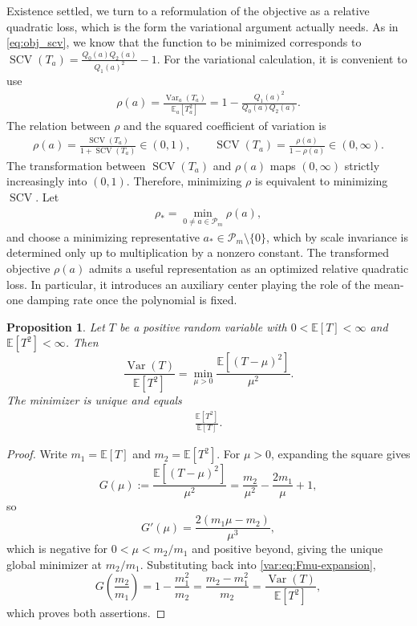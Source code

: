 \documentclass[11pt]{article}
\numberwithin{equation}{section}
\newtheorem{proposition}[theorem]{Proposition}
\theoremstyle{definition}
\theoremstyle{remark}
\newcommand{\E}{\mathbb E}
\newcommand{\Var}{\operatorname{Var}}
\newcommand{\SCV}{\operatorname{SCV}}
\newcommand{\Pcal}{\mathcal P}
\begin{document}
Existence settled, we turn to a reformulation of the objective as a relative quadratic loss, which is the form the variational argument actually needs. 
 As in \eqref{eq:obj_scv}, we know that the function to be minimized corresponds to $\SCV(T_a)=\frac{Q_0(a)Q_2(a)}{Q_1(a)^2}-1$.
For the variational calculation, it is convenient to use
\begin{align*}
    \rho(a)
    =\frac{\Var_a(T_a)}{\E_a[T_a^2]}
    =1-\frac{Q_1(a)^2}{Q_0(a)Q_2(a)}.
\end{align*}
The relation between \(\rho\) and the squared coefficient of variation is
\begin{align*}
    \rho(a)=\frac{\SCV(T_a)}{1+\SCV(T_a)}\in (0,1),
    \qquad
    \SCV(T_a)=\frac{\rho(a)}{1-\rho(a)} \in (0,\infty).
\end{align*}
The transformation between $\SCV(T_a)$ and $\rho(a)$ maps $(0,\infty)$ strictly increasingly into $(0,1)$. Therefore,
minimizing \(\rho\) is equivalent to minimizing \(\SCV\).  Let
\begin{align*}
    \rho_*=\min_{0\ne a\in\Pcal_m}\rho(a),
\end{align*}
and choose a minimizing representative \(a_*\in\Pcal_m\setminus\{0\}\), which
by scale invariance is determined only up to multiplication by a nonzero
constant. The transformed objective \(\rho(a)\) admits a useful
representation as an optimized relative quadratic loss. In particular, it introduces
an auxiliary center playing the role of the mean-one damping rate once the
polynomial is fixed.

\begin{proposition}\label{var:prop:relative-loss}
Let \(T\) be a positive random variable with \(0<\E[T]<\infty\) and \(\E[T^2]<\infty\). Then
\begin{equation*}
    \frac{\Var(T)}{\E[T^2]}
    =\min_{\mu>0}\frac{\E[(T-\mu)^2]}{\mu^2}.
\end{equation*}
The minimizer is unique and equals 
\begin{align*}
\frac{\E[T^2]}{\E[T]}.
\end{align*}
\end{proposition}
\begin{proof}
Write \(m_1=\E[T]\) and \(m_2=\E[T^2]\). For \(\mu>0\), expanding the square gives
\begin{equation}\label{var:eq:Fmu-expansion}
    G(\mu):=\frac{\E[(T-\mu)^2]}{\mu^2}
    =\frac{m_2}{\mu^2}-\frac{2m_1}{\mu}+1,
\end{equation}
so
\[
    G'(\mu)=\frac{2(m_1\mu-m_2)}{\mu^3},
\]
which is negative for \(0<\mu<m_2/m_1\) and positive beyond, giving the unique global minimizer at \(m_2/m_1\). Substituting back into \eqref{var:eq:Fmu-expansion},
\[
    G\left(\frac{m_2}{m_1}\right)
    =1-\frac{m_1^2}{m_2}
    =\frac{m_2-m_1^2}{m_2}
    =\frac{\Var(T)}{\E[T^2]},
\]
which proves both assertions.
\end{proof}
\end{document}
